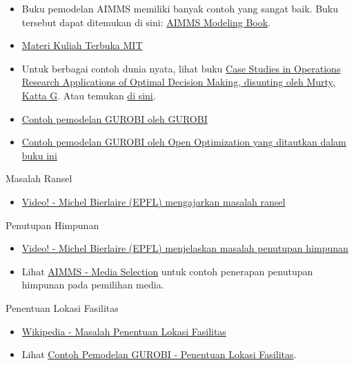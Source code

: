 \begin{resource}



\begin{itemize}
\item Buku pemodelan AIMMS memiliki banyak contoh yang sangat baik. Buku tersebut dapat ditemukan di sini: \href{https://www.aimms.com/english/developers/resources/manuals/optimization-modeling}{AIMMS Modeling Book}.
\item \href{http://web.mit.edu/15.053/www/AMP-Chapter-09.pdf}{Materi Kuliah Terbuka MIT}
\item Untuk berbagai contoh dunia nyata, lihat buku \href{https://link-springer-com.ezproxy.lib.vt.edu/book/10.1007/978-1-4939-1007-6}{
Case Studies in Operations Research
Applications of Optimal Decision Making, disunting oleh Murty, Katta G}.
Atau temukan \href{https://www.springer.com/gp/book/9781493910069}{di sini}.
\item \href{https://github.com/Gurobi/modeling-examples}{Contoh pemodelan GUROBI oleh GUROBI}
\item \href{https://github.com/open-optimization/open-optimization-or-examples/tree/master/integer-programming}{Contoh pemodelan GUROBI oleh Open Optimization yang ditautkan dalam buku ini}
\end{itemize}

Masalah Ransel
\begin{itemize}
\item \href{https://www.youtube.com/watch?v=GteOoMGUOdY}{Video! - Michel Bierlaire (EPFL) mengajarkan masalah ransel}
\end{itemize}

Penutupan Himpunan
\begin{itemize}
\item \href{https://www.youtube.com/watch?v=cjSeHSjPmsk}{Video! - Michel Bierlaire (EPFL) menjelaskan masalah penutupan himpunan}
\item Lihat \href{https://download.aimms.com/aimms/download/manuals/AIMMS3OM_MediaSelection.pdf}{AIMMS - Media Selection} untuk contoh penerapan penutupan himpunan pada pemilihan media.
\end{itemize}

Penentuan Lokasi Fasilitas
\begin{itemize}
\item \href{https://en.wikipedia.org/wiki/Facility_location_problem}{Wikipedia - Masalah Penentuan Lokasi Fasilitas}
\item Lihat \href{https://github.com/Gurobi/modeling-examples/tree/master/facility_location}{Contoh Pemodelan GUROBI - Penentuan Lokasi Fasilitas}.
\end{itemize}



\end{resource}
